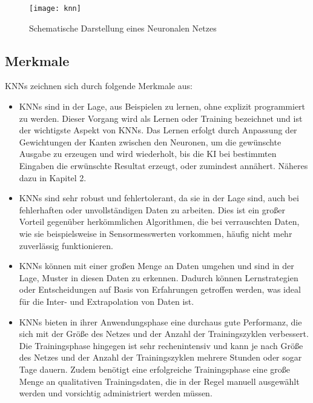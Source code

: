 \newpage


\begin{figure}[h]
    \centering
    \texttt{[image: knn]}
    \caption{Schematische Darstellung eines Neuronalen Netzes}
    \label{Abb:basic}
    \end{figure}

\subsection{Merkmale}

\noindent \acp{KNN} zeichnen sich durch folgende Merkmale aus:

\begin{itemize}
    \item \acp{KNN} sind in der Lage, aus Beispielen zu lernen, ohne explizit programmiert zu werden. Dieser Vorgang wird als Lernen oder Training bezeichnet und ist der wichtigste Aspekt von \acp{KNN}. Das Lernen erfolgt durch Anpassung der Gewichtungen der Kanten zwischen den Neuronen, um die gewünschte Ausgabe zu erzeugen und wird wiederholt, bis die KI bei bestimmten Eingaben die erwünschte Resultat erzeugt, oder zumindest annähert. Näheres dazu in Kapitel 2.
    \item \acp{KNN} sind sehr robust und fehlertolerant, da sie in der Lage sind, auch bei fehlerhaften oder unvollständigen Daten zu arbeiten. Dies ist ein großer Vorteil gegenüber herkömmlichen Algorithmen, die bei verrauschten Daten, wie sie beispielsweise in Sensormesswerten vorkommen, häufig nicht mehr zuverlässig funktionieren.
    \item \acp{KNN} können mit einer großen Menge an Daten umgehen und sind in der Lage, Muster in diesen Daten zu erkennen. Dadurch können Lernstrategien oder Entscheidungen auf Basis von Erfahrungen getroffen werden, was ideal für die Inter- und Extrapolation von Daten ist.
    \item \acp{KNN} bieten in ihrer Anwendungsphase eine durchaus gute Performanz, die sich mit der Größe des Netzes und der Anzahl der Trainingszyklen verbessert. Die Trainingsphase hingegen ist sehr rechenintensiv und kann je nach Größe des Netzes und der Anzahl der Trainingszyklen mehrere Stunden oder sogar Tage dauern. Zudem benötigt eine erfolgreiche Trainingsphase eine große Menge an qualitativen Trainingsdaten, die in der Regel manuell ausgewählt werden und vorsichtig administriert werden müssen.
    \end{itemize}
    

\newpage